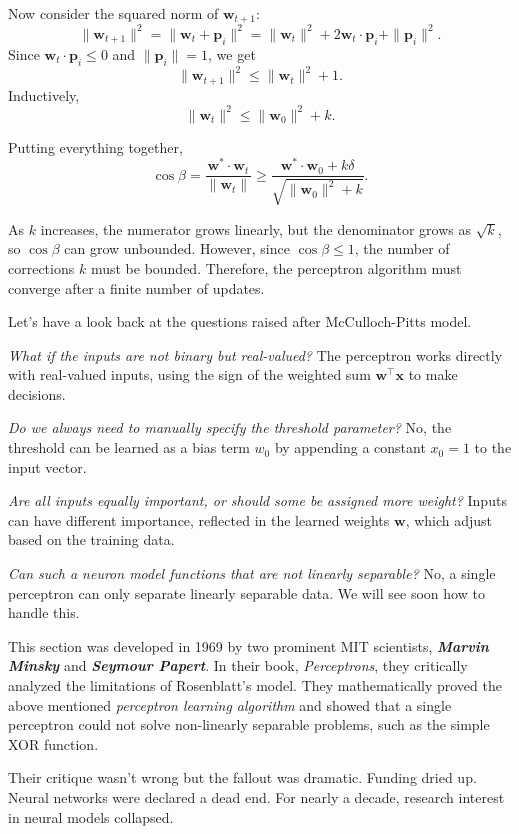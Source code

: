 Now consider the squared norm of $\mathbf{w}_{t+1}$:
\[
\|\mathbf{w}_{t+1}\|^2 = \|\mathbf{w}_t + \mathbf{p}_i\|^2 = \|\mathbf{w}_t\|^2 + 2 \mathbf{w}_t \cdot \mathbf{p}_i + \|\mathbf{p}_i\|^2.
\]
Since $\mathbf{w}_t \cdot \mathbf{p}_i \leq 0$ and $\|\mathbf{p}_i\| = 1$, we get
\[ \|\mathbf{w}_{t+1}\|^2 \leq \|\mathbf{w}_t\|^2 + 1. \]
Inductively,
\[ \|\mathbf{w}_t\|^2 \leq \|\mathbf{w}_0\|^2 + k. \]

Putting everything together,
\[
\cos \beta = \frac{\mathbf{w}^* \cdot \mathbf{w}_t}{\|\mathbf{w}_t\|} \geq \frac{\mathbf{w}^* \cdot \mathbf{w}_0 + k\delta}{\sqrt{\|\mathbf{w}_0\|^2 + k}}.
\]

As $k$ increases, the numerator grows linearly, but the denominator grows as $\sqrt{k}$, so $\cos \beta$ can grow unbounded. However, since $\cos \beta \leq 1$, the number of corrections $k$ must be bounded. Therefore, the perceptron algorithm must converge after a finite number of updates.

Let's have a look back at the questions raised after McCulloch-Pitts model. 

\textit{What if the inputs are not binary but real-valued?}
The perceptron works directly with real-valued inputs, using the sign of the weighted sum $\mathbf{w}^\top \mathbf{x}$ to make decisions.

\textit{Do we always need to manually specify the threshold parameter?}
No, the threshold can be learned as a bias term $w_0$ by appending a constant $x_0 = 1$ to the input vector.

\textit{Are all inputs equally important, or should some be assigned more weight?}
Inputs can have different importance, reflected in the learned weights $\mathbf{w}$, which adjust based on the training data.

\textit{Can such a neuron model functions that are not linearly separable?}
No, a single perceptron can only separate linearly separable data. We will see soon how to handle this. 

This section was developed in 1969 by two prominent MIT scientists, \textit{\textbf{Marvin Minsky}} and \textit{\textbf{Seymour Papert}}. In their book, \textit{Perceptrons}, they critically analyzed the limitations of Rosenblatt's model. They mathematically proved the above mentioned \textit{perceptron learning algorithm} and showed that a single perceptron could not solve non-linearly separable problems, such as the simple XOR function.

Their critique wasn't wrong but the fallout was dramatic. Funding dried up. Neural networks were declared a dead end. For nearly a decade, research interest in neural models collapsed.

